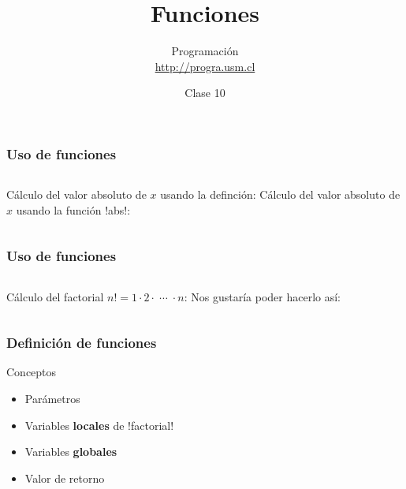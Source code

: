 \documentclass[12pt]{beamer}
\title{Funciones}
\author{
  Programación \\ \url{http://progra.usm.cl}
}
\date{Clase 10}
\begin{document}
  \begin{frame}
    \maketitle
  \end{frame}

  \begin{frame}
    \frametitle{Uso de funciones}
    \label{uso-funcion-abs}
    \begin{columns}[t]
        Cálculo del valor absoluto de \(x\)
        usando la definción:
        Cálculo del valor absoluto de \(x\)
        usando la función \li!abs!:
    \end{columns}
    \vspace{2ex}
    \begin{columns}[t]
        \footnotesize
        
        \footnotesize
        
    \end{columns}
  \end{frame}

  \begin{frame}
    \frametitle{Uso de funciones}
    \label{uso-funcion-factorial}
    \begin{columns}[t]
        Cálculo del factorial \(n! = 1\cdot 2\cdot\;\cdots\;\cdot n\):
        Nos gustaría
        poder hacerlo así:
    \end{columns}
    \vspace{2ex}
    \begin{columns}[t]
        \footnotesize
        
        \footnotesize
        
    \end{columns}
  \end{frame}

  \begin{frame}
    \frametitle{Definición de funciones}
    \label{def-fn-factorial}
    
  \end{frame}

  \begin{frame}
    \label{conceptos-funciones}
    \begin{block}{Conceptos}
      \begin{itemize}
        \item Parámetros
        \item Variables \textbf{locales} de \li!factorial!
        \item Variables \textbf{globales}
        \item Valor de retorno
      \end{itemize}
    \end{block}
    \footnotesize
    
  \end{frame}
\end{document}
